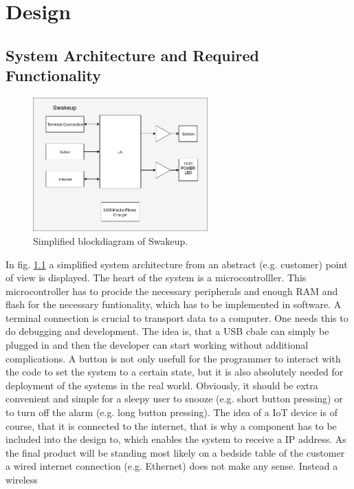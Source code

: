 \chapter{Design}
\label{chap:design}
\section{System Architecture and Required Functionality}
\label{sec:system_arch_and_req}
\begin{figure}[H]
	\centering
	\label{fig:block_simp}
	\includegraphics[width=0.6\textwidth]{../block/block_simplified.png}
	\caption{Simplified blockdiagram of Swakeup.}
\end{figure}
In fig. \ref{fig:block_simp} a simplified system architecture from an abstract
(e.g. customer) point of view is displayed. The heart of the system is a
microcontrolller. This microcontroller has to procide the necessary peripherals
and enough RAM and flash for the necessary funtionality, which has to be
implemented in software.  \newpar A terminal connection is crucial to transport
data to a computer. One needs this to do debugging and development. The idea is,
that a USB cbale can simply be plugged in and then the developer can start
working without additional complications.  \newpar A button is not only usefull
for the programmer to interact with the code to set the system to a certain
state, but it is also absolutely needed for deployment of the systems in the
real world.  Obviously, it should be extra convenient and simple for a sleepy
user to snooze (e.g. short button pressing) or to turn off the alarm (e.g. long
button pressing).  \newpar The idea of a IoT device is of course, that it is
connected to the internet, that is why a component has to be included into the
design to, which enables the system to receive a IP address. As the final
product will be standing most likely on a bedside table of the customer a wired
internet connection (e.g. Ethernet) does not make any sense. Instead a wireless
